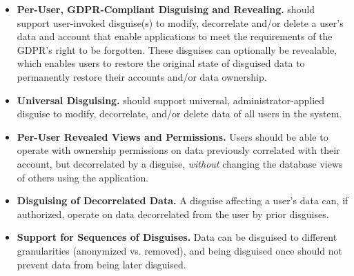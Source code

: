 \begin{itemize}
    \item\textbf{Per-User, GDPR-Compliant Disguising and Revealing.}
\sys should support user-invoked disguise(s) to modify, decorrelate and/or delete a user's data and
account that enable applications to meet the requirements of the GDPR's right to be forgotten.
%
These disguises can optionally be revealable, which enables users to restore the original state of
        disguised data to \eg permanently restore their accounts and/or data ownership.

\item\textbf{Universal Disguising.}
\sys should support universal, administrator-applied disguise to modify, decorrelate, and/or delete
        data of all users in the system.
%

\item\textbf{Per-User Revealed Views and Permissions.}
Users should be able to operate with ownership permissions on data previously correlated with their
account, but decorrelated by a disguise, \emph{without} changing the database views of others using
the application. 

\item\textbf{Disguising of Decorrelated Data.}
A disguise affecting a user's data can, if authorized, operate on data decorrelated from the user by
prior disguises.

\item\textbf{Support for Sequences of Disguises.}
Data can be disguised to different granularities (\eg anonymized vs. removed), and being disguised
once should not prevent data from being later disguised.
\end{itemize}

